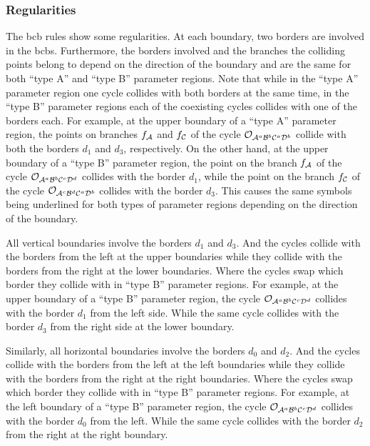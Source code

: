 \subsubsection{Regularities}

The \gls{bcb} rules show some regularities.
At each boundary, two borders are involved in the \glspl{bcb}.
Furthermore, the borders involved and the branches the colliding points belong to depend on the direction of the boundary and are the same for both ``type A'' and ``type B'' parameter regions.
Note that while in the ``type A'' parameter region one cycle collides with both borders at the same time, in the ``type B'' parameter regions each of the coexisting cycles collides with one of the borders each.
For example, at the upper boundary of a ``type A'' parameter region, the points on branches $f_{\mathcal{A}}$ and $f_{\mathcal{C}}$ of the cycle $\mathcal{O}_{\mathcal{A}^a\mathcal{B}^b\mathcal{C}^a\mathcal{D}^b}$ collide with both the borders $d_1$ and $d_3$, respectively.
On the other hand, at the upper boundary of a ``type B'' parameter region, the point on the branch $f_{\mathcal{A}}$ of the cycle $\mathcal{O}_{\mathcal{A}^a\mathcal{B}^b\mathcal{C}^c\mathcal{D}^d}$ collides with the border $d_1$, while the point on the branch $f_{\mathcal{C}}$ of the cycle $\mathcal{O}_{\mathcal{A}^c\mathcal{B}^d\mathcal{C}^a\mathcal{D}^b}$ collides with the border $d_3$.
This causes the same symbols being underlined for both types of parameter regions depending on the direction of the boundary.

All vertical boundaries involve the borders $d_1$ and $d_3$.
And the cycles collide with the borders from the left at the upper boundaries while they collide with the borders from the right at the lower boundaries.
Where the cycles swap which border they collide with in ``type B'' parameter regions.
For example, at the upper boundary of a ``type B'' parameter region, the cycle $\mathcal{O}_{\mathcal{A}^a\mathcal{B}^b\mathcal{C}^c\mathcal{D}^d}$ collides with the border $d_1$ from the left side.
While the same cycle collides with the border $d_3$ from the right side at the lower boundary.

Similarly, all horizontal boundaries involve the borders $d_0$ and $d_2$.
And the cycles collide with the borders from the left at the left boundaries while they collide with the borders from the right at the right boundaries.
Where the cycles swap which border they collide with in ``type B'' parameter regions.
For example, at the left boundary of a ``type B'' parameter region, the cycle $\mathcal{O}_{\mathcal{A}^a\mathcal{B}^b\mathcal{C}^c\mathcal{D}^d}$ collides with the border $d_0$ from the left.
While the same cycle collides with the border $d_2$ from the right at the right boundary.
